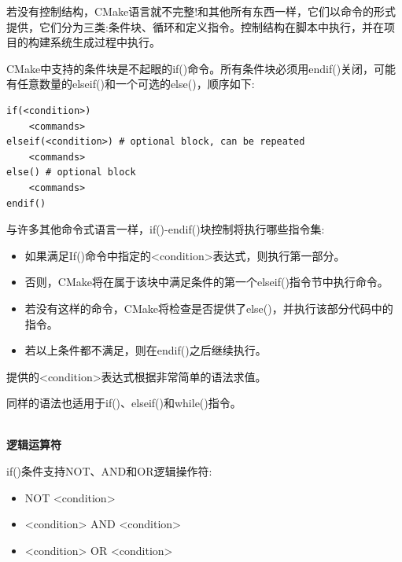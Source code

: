 
若没有控制结构，CMake语言就不完整!和其他所有东西一样，它们以命令的形式提供，它们分为三类:条件块、循环和定义指令。控制结构在脚本中执行，并在项目的构建系统生成过程中执行。


CMake中支持的条件块是不起眼的if()命令。所有条件块必须用endif()关闭，可能有任意数量的elseif()和一个可选的else()，顺序如下:

\begin{lstlisting}[style=styleCMake]
if(<condition>)
	<commands>
elseif(<condition>) # optional block, can be repeated
	<commands>
else() # optional block
	<commands>
endif()
\end{lstlisting}

与许多其他命令式语言一样，if()-endif()块控制将执行哪些指令集:

\begin{itemize}
\item 
如果满足If()命令中指定的<condition>表达式，则执行第一部分。

\item 
否则，CMake将在属于该块中满足条件的第一个elseif()指令节中执行命令。

\item 
若没有这样的命令，CMake将检查是否提供了else()，并执行该部分代码中的指令。

\item 
若以上条件都不满足，则在endif()之后继续执行。
\end{itemize}

提供的<condition>表达式根据非常简单的语法求值。


同样的语法也适用于if()、elseif()和while()指令。

\hspace*{\fill} \\ %
\noindent
\textbf{逻辑运算符}

if()条件支持NOT、AND和OR逻辑操作符:

\begin{itemize}
\item 
NOT <condition>

\item 
<condition> AND <condition>

\item 
<condition> OR <condition>
\end{itemize}

